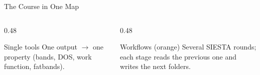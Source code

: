 \documentclass[8pt]{beamer}
\begin{document}
\begin{frame}{The Course in One Map}
{	}
	\vspace{0.25cm}
	\begin{columns}[T]
		\begin{column}{0.48\textwidth}
			\begin{block}{Single tools}
				One output $\rightarrow$ one property
				(bands, DOS, work function, fatbands).
			\end{block}
		\end{column}
		\begin{column}{0.48\textwidth}
			\begin{block}{Workflows (orange)}
				Several SIESTA rounds; each stage reads the previous one
				and writes the next folders.
			\end{block}
		\end{column}
	\end{columns}
\end{frame}
\end{document}
